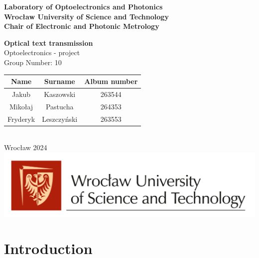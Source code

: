 \documentclass[12pt]{article}
\def\thetitle{Optical text transmission}
\begin{document}
	\begin{titlepage}
		\begin{center}
			\vspace{1cm}
			\textbf{Laboratory of Optoelectronics and Photonics} \\
			\textbf{Wrocław University of Science and Technology} \\
			\textbf{Chair of Electronic and Photonic Metrology}
			
			\vspace{8cm}
		
		\textbf{\Huge\thetitle} \\
		\vspace{5pt}
		\Large Optoelectronics - project \\
		\vspace{20pt}
		\normalsize
		Group Number: 10\\
		
		\begin{tabular}{ |c|c|c| } 
			\hline
			Name & Surname & Album number \\ \hline
			Jakub & Kaszowski & 263544 \\ \hline
			Mikołaj & Pastucha & 264353 \\  \hline
			Fryderyk & Leszczyński & 263553 \\
			\hline
		\end{tabular} \\
		\vspace{5pt}
		Wrocław 2024 \\
			\vspace{7cm}
    \includegraphics[scale=0.5]{footer.png}

		\end{center}
		
	\end{titlepage}	
  \newpage
	\tableofcontents{\thispagestyle{fancyplain}}
  \newpage
	
	\section{Introduction}
\end{document}
